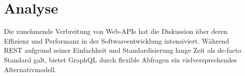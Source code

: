 \chapter{Analyse} %
\label{sec:analyse}
Die zunehmende Verbreitung von Web-APIs hat die Diskussion über deren Effizienz und Performanz in der Softwareentwicklung intensiviert. Während REST aufgrund seiner Einfachheit und Standardisierung lange Zeit als de-facto Standard galt, bietet GraphQL durch flexible Abfragen ein vielversprechendes Alternativmodell. 


